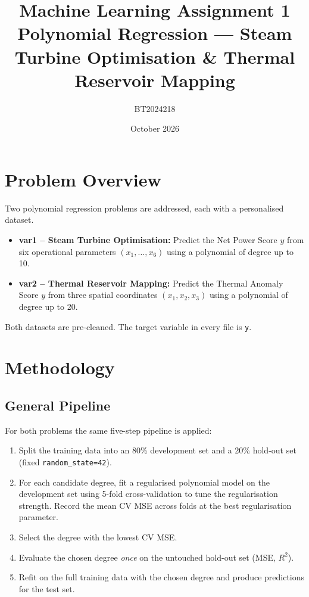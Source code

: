 \documentclass[11pt,a4paper]{article}
\title{\textbf{Machine Learning Assignment 1}\\[0.4em]
       \large Polynomial Regression --- Steam Turbine Optimisation \& Thermal Reservoir Mapping}
\author{BT2024218}
\date{October 2026}
\begin{document}
\maketitle
\tableofcontents
\newpage

\section{Problem Overview}

Two polynomial regression problems are addressed, each with a personalised dataset.

\begin{itemize}
  \item \textbf{var1 -- Steam Turbine Optimisation:} Predict the Net Power Score $y$ from
        six operational parameters $(x_1,\ldots,x_6)$ using a polynomial of degree up to 10.
  \item \textbf{var2 -- Thermal Reservoir Mapping:} Predict the Thermal Anomaly Score $y$
        from three spatial coordinates $(x_1, x_2, x_3)$ using a polynomial of degree up to 20.
\end{itemize}

Both datasets are pre-cleaned. The target variable in every file is \texttt{y}.

\section{Methodology}

\subsection{General Pipeline}

For both problems the same five-step pipeline is applied:

\begin{enumerate}
  \item Split the training data into an 80\% development set and a 20\% hold-out set
        (fixed \texttt{random\_state=42}).
  \item For each candidate degree, fit a regularised polynomial model on the development
        set using 5-fold cross-validation to tune the regularisation strength.
        Record the mean CV MSE across folds at the best regularisation parameter.
  \item Select the degree with the lowest CV MSE.
  \item Evaluate the chosen degree \emph{once} on the untouched hold-out set (MSE, $R^2$).
  \item Refit on the full training data with the chosen degree and produce predictions for
        the test set.
\end{enumerate}
\end{document}
